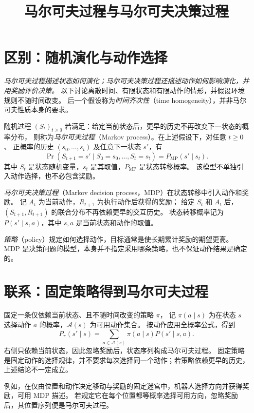 \documentclass[UTF8,12pt,a4paper,fontset=fandol]{ctexart}
\title{马尔可夫过程与马尔可夫决策过程}
\author{}
\date{}
\begin{document}
\maketitle

\section{区别：随机演化与动作选择}
\label{sec:mp-mdp-distinction}

\emph{马尔可夫过程描述状态如何演化；马尔可夫决策过程还描述动作如何影响演化，并用奖励评价决策。}
以下讨论离散时间、有限状态和有限动作的情形，并假设环境规则不随时间改变。
后一个假设称为\emph{时间齐次性}（time homogeneity），并非马尔可夫性质本身的要求。

\begin{definition}[马尔可夫过程]
随机过程 $(S_t)_{t\geq0}$ 若满足：给定当前状态后，更早的历史不再改变下一状态的概率分布，
则称为\emph{马尔可夫过程}（Markov process）。在上述假设下，对任意 $t\geq0$、
正概率的历史 $(s_0,\ldots,s_t)$ 及任意下一状态 $s'$，有
\begin{equation}
  \Pr(S_{t+1}=s'\mid S_0=s_0,\ldots,S_t=s_t)
  =P_{\mathrm{MP}}(s'\mid s_t).
  \label{eq:mp-mdp-markov}
\end{equation}
其中 $S_t$ 是状态随机变量，$s_t$ 是其取值，$P_{\mathrm{MP}}$ 是状态转移概率。
该模型不单独引入动作选择，也不必包含奖励。
\end{definition}

\begin{definition}[马尔可夫决策过程]
\emph{马尔可夫决策过程}（Markov decision process，MDP）在状态转移中引入动作和奖励。
记 $A_t$ 为当前动作，$R_{t+1}$ 为执行动作后获得的奖励；
给定 $S_t$ 和 $A_t$ 后，$(S_{t+1},R_{t+1})$ 的联合分布不再依赖更早的交互历史。
状态转移概率记为 $P(s'\mid s,a)$，其中 $s,a$ 是当前状态和动作的取值。
\end{definition}

\emph{策略}（policy）规定如何选择动作，目标通常是使长期累计奖励的期望更高。
MDP 是决策问题的模型，本身并不指定采用哪条策略，也不保证动作结果是确定的。

\section{联系：固定策略得到马尔可夫过程}
\label{sec:mp-mdp-fixed-policy}

固定一条仅依赖当前状态、且不随时间改变的策略 $\pi$，
记 $\pi(a\mid s)$ 为在状态 $s$ 选择动作 $a$ 的概率，$\mathcal A(s)$ 为可用动作集合。
按动作应用全概率公式，得到
\begin{equation}
  P_\pi(s'\mid s)
  =\sum_{a\in\mathcal A(s)}\pi(a\mid s)P(s'\mid s,a).
  \label{eq:mp-mdp-induced-transition}
\end{equation}
右侧只依赖当前状态，因此忽略奖励后，状态序列构成马尔可夫过程。
固定策略是固定动作的选择规律，并不要求每次选择同一个动作；若策略依赖更早的历史，上述结论不一定成立。

例如，在仅由位置和动作决定移动与奖励的固定迷宫中，机器人选择方向并获得奖励，可用 MDP 描述。
若规定它在每个位置都等概率选择可用方向，忽略奖励后，其位置序列便是马尔可夫过程。
\end{document}
